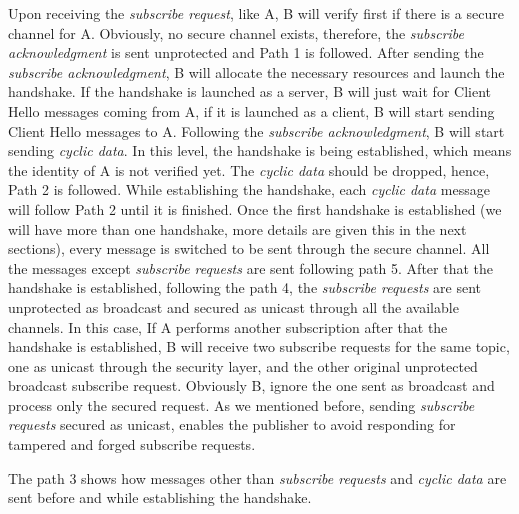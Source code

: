 Upon receiving the \textit{subscribe request}, like A, B will verify first if there is a secure channel for A.
Obviously, no secure channel exists, therefore, the \textit{subscribe acknowledgment} is sent unprotected and Path 1 is followed.
After sending the \textit{subscribe acknowledgment}, B will allocate the necessary resources and launch the handshake.
If the handshake is launched as a server, B will just wait for Client Hello messages coming from A, if it is
launched as a client, B will start sending Client Hello messages to A. Following the \textit{subscribe acknowledgment},
B will start sending \textit{cyclic data}. In this level, the handshake is being established, which means the identity of A
is not verified yet. The \textit{cyclic data} should be dropped, hence, Path 2 is followed. While establishing the handshake,
each \textit{cyclic data} message will follow Path 2 until it is finished. Once the first handshake is
established (we will have more than one handshake, more
details are given this in the next sections), every message is switched to be sent through the secure
channel. All the messages except \textit{subscribe requests} are sent following path 5. After that the handshake is established,
following the path 4, the \textit{subscribe requests} are sent unprotected as broadcast and secured as unicast through all the available channels.
In this case, If A performs another subscription after that the handshake is established, B will receive two subscribe requests
for the same topic, one as unicast through the security layer, and the other original unprotected broadcast subscribe request.
Obviously B, ignore the one sent as broadcast and process only the secured request. As we mentioned before,
sending \textit{subscribe requests} secured as unicast, enables the publisher to avoid responding for tampered and forged subscribe requests.

The path 3 shows how messages other than \textit{subscribe requests} and \textit{cyclic data} are sent before and while establishing the handshake.

